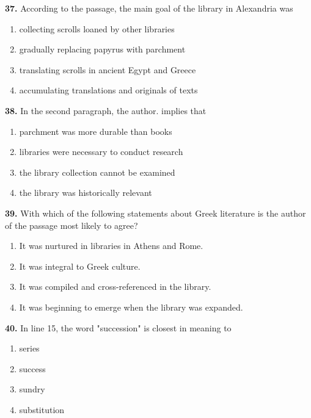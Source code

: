 \documentclass[12pt]{article}
\begin{document}
\par
\vspace{0.25\baselineskip}
\noindent\textbf{37.} According to the passage, the main goal of the library in Alexandria was
\begin{enumerate}[label=(\Alph*),leftmargin=*,itemsep=0.2em]
\item collecting scrolls loaned by other libraries
\item gradually replacing papyrus with parchment
\item translating scrolls in ancient Egypt and Greece
\item accumulating translations and originals of texts
\end{enumerate}
\par
\vspace{0.25\baselineskip}
\noindent\textbf{38.} In the second paragraph, the author. implies that
\begin{enumerate}[label=(\Alph*),leftmargin=*,itemsep=0.2em]
\item parchment was more durable than books
\item libraries were necessary to conduct research
\item the library collection cannot be examined
\item the library was historically relevant
\end{enumerate}
\par
\vspace{0.25\baselineskip}
\noindent\textbf{39.} With which of the following statements about Greek literature is the author of the passage most likely to agree?
\begin{enumerate}[label=(\Alph*),leftmargin=*,itemsep=0.2em]
\item It was nurtured in libraries in Athens and Rome.
\item It was integral to Greek culture.
\item It was compiled and cross-referenced in the library.
\item It was beginning to emerge when the library was expanded.
\end{enumerate}
\par
\vspace{0.25\baselineskip}
\noindent\textbf{40.} In line 15, the word "succession" is closest in meaning to
\begin{enumerate}[label=(\Alph*),leftmargin=*,itemsep=0.2em]
\item series
\item success
\item sundry
\item substitution
\end{enumerate}
\end{document}
